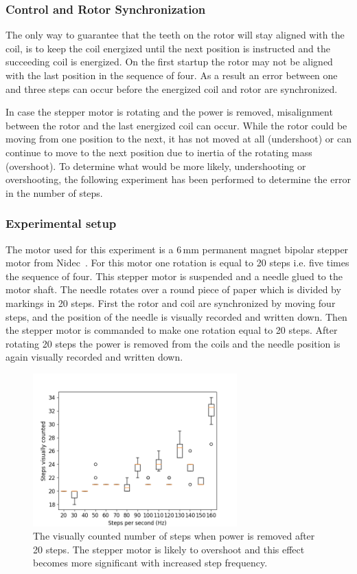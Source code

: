 \subsubsection{Control and Rotor Synchronization}

The only way to guarantee that the teeth on the rotor will stay aligned with the coil, is to keep the coil energized until the next position is instructed and the succeeding coil is energized. 
On the first startup the rotor may not be aligned with the last position in the sequence of four.
As a result an error between one and three steps can occur before the energized coil and rotor are synchronized.

In case the stepper motor is rotating and the power is removed, misalignment between the rotor and the last energized coil can occur. While the rotor could be moving from one position to the next, it has not moved at all (undershoot) or can continue to move to the next position due to inertia of the rotating mass (overshoot). 
To determine what would be more likely, undershooting or overshooting, the following experiment has been performed to determine the error in the number of steps.

\subsubsection{Experimental setup}

The motor used for this experiment is a 6\,mm permanent magnet bipolar stepper motor from Nidec~\cite{nidec_stepper_2017}.
For this motor one rotation is equal to 20 steps i.e. five times the sequence of four.
This stepper motor is suspended and a needle glued to the motor shaft. The needle rotates over a round piece of paper which is divided by markings in 20 steps. %
First the rotor and coil are synchronized by moving four steps, and the position of the needle is visually recorded and written down. 
Then the stepper motor is commanded to make one rotation equal to 20 steps. 
After rotating 20 steps the power is removed from the coils and the needle position is again visually recorded and written down.

\begin{figure}
	\centering
	\includegraphics[width=0.7\textwidth]{pics/figure_intertia.png}
	\caption{The visually counted number of steps when power is removed after 20 steps. The stepper motor is likely to overshoot and this effect becomes more significant with increased step frequency.}
	\label{fig:step_results}
\end{figure}


